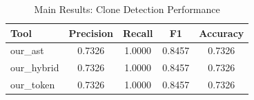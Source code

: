 \begin{table}[h]
\centering
\caption{Main Results: Clone Detection Performance}
\label{tab:main-results}
\begin{tabular}{lcccc}
\toprule
Tool & Precision & Recall & F1 & Accuracy \\
\midrule
our_ast & 0.7326 & 1.0000 & 0.8457 & 0.7326 \\
our_hybrid & 0.7326 & 1.0000 & 0.8457 & 0.7326 \\
our_token & 0.7326 & 1.0000 & 0.8457 & 0.7326 \\
\bottomrule
\end{tabular}
\end{table}